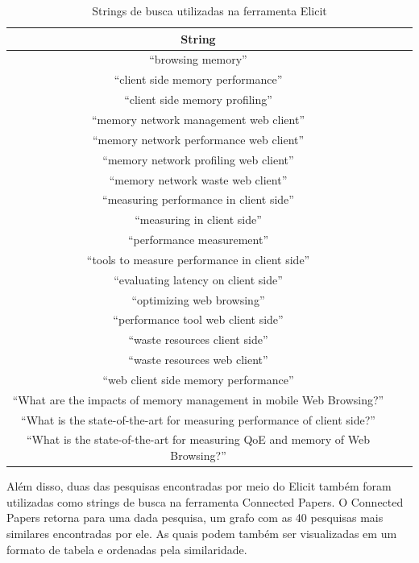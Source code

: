\documentclass[12pt]{tcc}
\begin{document}
\begin{table}[!ht]
	\centering
	\caption{Strings de busca utilizadas na ferramenta Elicit}
	\begin{tabular}{c L{1.5cm} R{1.5cm}}
		\toprule
		\textbf{String} \\
		\midrule
		``browsing memory'' \\
		``client side memory performance'' \\
		``client side memory profiling'' \\
		``memory network management web client'' \\
		``memory network performance web client'' \\
		``memory network profiling web client'' \\
		``memory network waste web client'' \\
		``measuring performance in client side'' \\
		``measuring in client side'' \\
		``performance measurement'' \\
		``tools to measure performance in client side'' \\
		``evaluating latency on client side'' \\
		``optimizing web browsing'' \\
		``performance tool web client side'' \\
		``waste resources client side'' \\
		``waste resources web client'' \\
		``web client side memory performance'' \\
		``What are the impacts of memory management in mobile Web Browsing?'' \\
		``What is the state-of-the-art for measuring performance of client side?'' \\
		``What is the state-of-the-art for measuring QoE and memory of Web Browsing?'' \\
		\bottomrule
	\end{tabular}
	\label{tab:string-busca-elicit}
\end{table}

Além disso, duas das pesquisas encontradas por meio do Elicit também foram utilizadas como strings de busca na ferramenta Connected Papers.
O Connected Papers retorna para uma dada pesquisa, um grafo com as 40 pesquisas mais similares encontradas por ele.
As quais podem também ser visualizadas em um formato de tabela e ordenadas pela similaridade.
\end{document}
